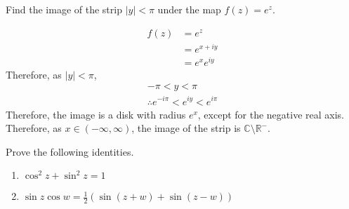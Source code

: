 \documentclass[fleqn, a4paper, 11pt, oneside]{amsart}
\theoremstyle{definition}
\theoremstyle{theorem}
\begin{document}
\setcounter{question}{3}
\begin{question}
	Find the image of the strip $|y| < \pi$ under the map $f(z) = e^z$.
\end{question}

\begin{solution}
	\begin{align*}
		f(z) & = e^z         \\
                     & = e^{x + i y} \\
                     & = e^x e^{i y}
	\end{align*}
	Therefore, as $|y| < \pi$,
	\begin{gather*}
		-\pi < y < \pi\\
		\therefore e^{-i \pi} < e^{i y} < e^{i \pi}
	\end{gather*}
	Therefore, the image is a disk with radius $e^x$, except for the negative real axis.\\
	Therefore, as $x \in (-\infty,\infty)$, the image of the strip is $\mathbb{C} \setminus \mathbb{R}^-$.
\end{solution}

\setcounter{question}{5}
\begin{question}
	Prove the following identities.
	\begin{enumerate}
		\setcounter{enumi}{0}
		\item $\cos^2 z + \sin^2 z = 1$
		\item $\sin z \cos w = \frac{1}{2} \left( \sin(z + w) + \sin(z - w) \right)$
	\end{enumerate}
\end{question}
\end{document}
